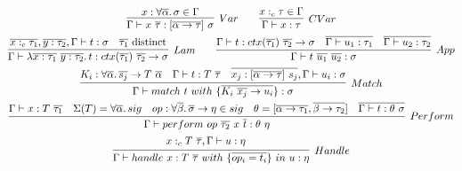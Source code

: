 \documentclass[acmsmall]{acmart}
\newcommand{\mathframebox}[1]{\framebox{$\displaystyle #1$}}
\newcommand{\ap}{~}
\begin{document}
\begin{figure}
    \mathframebox{\Gamma\vdash t : \tau} \\
    \begin{gather*}
        \infer[Var]{\Gamma\vdash x\ap\overline{\tau} : [\overline{\alpha\to\tau}]\ap\sigma}{x : \forall\overline{\alpha}\ldotp \sigma \in \Gamma}
        \text{\hspace{2em}}
        \infer[CVar]{\Gamma\vdash x : \tau}{x :_c \tau \in \Gamma} \\
        \infer[Lam]{
            \Gamma\vdash \lambda \overline{x : \tau_1} ~ \overline{y : \tau_2} \ldotp t : ctx(\overline{\tau_1}) ~ \overline{\tau_2} \to \sigma
        }{
            \overline{x :_c \tau_1}, \overline{y : \tau_2}, \Gamma\vdash t : \sigma &
            \overline{\tau_1} \text{ distinct}
        }
        \text{\hspace{2em}}
        \infer[App]{
            \Gamma\vdash t \ap \overline{u_1} \ap \overline{u_2} : \sigma
        } {
            \Gamma\vdash t : ctx(\overline{\tau_1})~\overline{\tau_2}\to\sigma
            &
            \overline{\Gamma\vdash u_1 : \tau_1}
            &
            \overline{\Gamma\vdash u_2 : \tau_2}
        }\\
        \infer[Match]{
            \Gamma\vdash match ~ t ~with ~\{ \overline{K_i\ap \overline{x_j} \to u_i }\}  : \sigma
        }{
            K_i : \forall \overline{\alpha}\ldotp \overline{s_j} \to T\ap\overline{\alpha} &
            \Gamma\vdash t : T \ap\overline{\tau} &
            \overline{x_j : [\overline{\alpha\to\tau}]\ap s_j}, \Gamma \vdash u_i : \sigma
        }\\
        \infer[Perform]{
            \Gamma\vdash perform \ap op\ap \overline{\tau_2}\ap x\ap \overline{t} : \theta\ap\eta
        }{
            \Gamma\vdash x : T\ap \overline{\tau_1} &
            \Sigma(T) = \forall\overline{\alpha}\ldotp sig &
            op : \forall\overline{\beta}\ldotp \overline{\sigma}\to\eta \in sig &
            \theta = [\overline{\alpha\to\tau_1}, \overline{\beta\to\tau_2}] &
            \overline{\Gamma\vdash t : \theta\ap\sigma}
        }\\
        \infer[Handle]{
            \Gamma \vdash handle ~ x : T\ap\overline{\tau}~ with ~ \{\overline{op_i = t_i}\} ~in~u : \eta
        }{
            \begin{gathered}
                x :_c T\ap\overline{\tau}, \Gamma\vdash u : \eta
            \end{gathered}
            &
            \begin{array}{ll}

\end{array}}
\end{gather*}
\end{figure}
\end{document}
